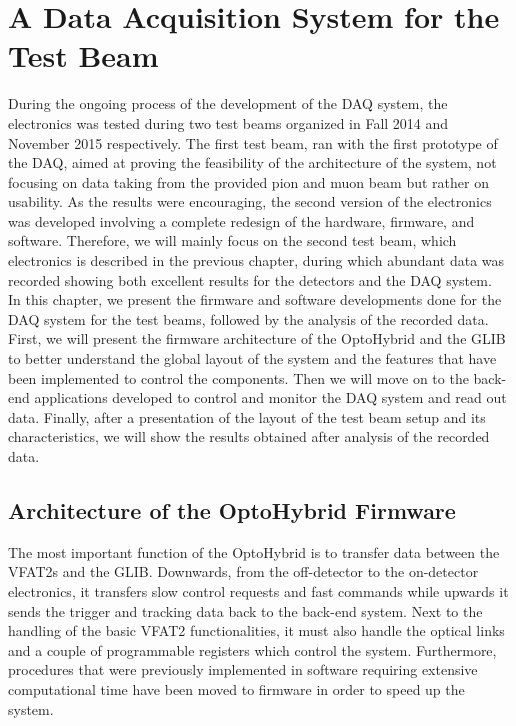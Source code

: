 \chapter{A Data Acquisition System for the Test Beam}
\label{chap:II-3-test-beam}

  During the ongoing process of the development of the DAQ system, the electronics was tested during two test beams organized in Fall 2014 and November 2015 respectively. The first test beam, ran with the first prototype of the DAQ, aimed at proving the feasibility of the architecture of the system, not focusing on data taking from the provided pion and muon beam but rather on usability. As the results were encouraging, the second version of the electronics was developed involving a complete redesign of the hardware, firmware, and software. Therefore, we will mainly focus on the second test beam, which electronics is described in the previous chapter, during which abundant data was recorded showing both excellent results for the detectors and the DAQ system. \\

  In this chapter, we present the firmware and software developments done for the DAQ system for the test beams, followed by the analysis of the recorded data. First, we will present the firmware architecture of the OptoHybrid and the GLIB to better understand the global layout of the system and the features that have been implemented to control the components. Then we will move on to the back-end applications developed to control and monitor the DAQ system and read out data. Finally, after a presentation of the layout of the test beam setup and its characteristics, we will show the results obtained after analysis of the recorded data.

  \section{Architecture of the OptoHybrid Firmware}

    The most important function of the OptoHybrid is to transfer data between the VFAT2s and the GLIB. Downwards, from the off-detector to the on-detector electronics, it transfers slow control requests and fast commands while upwards it sends the trigger and tracking data back to the back-end system. Next to the handling of the basic VFAT2 functionalities, it must also handle the optical links and a couple of programmable registers which control the system. Furthermore, procedures that were previously implemented in software requiring extensive computational time have been moved to firmware in order to speed up the system. \\

